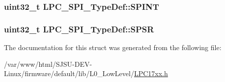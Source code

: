 \subsubsection[{\texorpdfstring{S\+P\+I\+NT}{SPINT}}]{ uint32\+\_\+t L\+P\+C\+\_\+\+S\+P\+I\+\_\+\+Type\+Def\+::\+S\+P\+I\+NT}\hypertarget{structLPC__SPI__TypeDef_a44a40dbc05125566c6f8426daa13254a}{}\label{structLPC__SPI__TypeDef_a44a40dbc05125566c6f8426daa13254a}
\subsubsection[{\texorpdfstring{S\+P\+SR}{SPSR}}]{ uint32\+\_\+t L\+P\+C\+\_\+\+S\+P\+I\+\_\+\+Type\+Def\+::\+S\+P\+SR}\hypertarget{structLPC__SPI__TypeDef_aebaf5d2e15c80b727a52076ebdfe2f03}{}\label{structLPC__SPI__TypeDef_aebaf5d2e15c80b727a52076ebdfe2f03}


The documentation for this struct was generated from the following file\+:\begin{DoxyCompactItemize}
\item 
/var/www/html/\+S\+J\+S\+U-\/\+D\+E\+V-\/\+Linux/firmware/default/lib/\+L0\+\_\+\+Low\+Level/\hyperlink{LPC17xx_8h}{L\+P\+C17xx.\+h}\end{DoxyCompactItemize}
